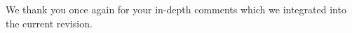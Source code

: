 \documentclass[]{article}
\begin{document}
We thank you once again for your in-depth comments which we integrated into the current revision.

\medskip





\end{document}
